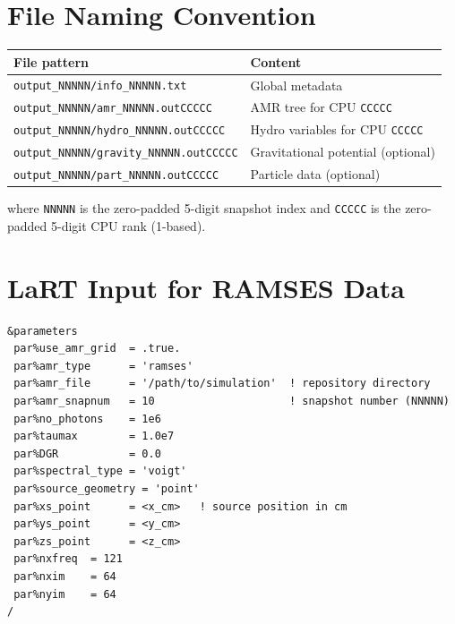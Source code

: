 \documentclass[english,a4paper]{my_memo}
\begin{document}
\section{File Naming Convention}

\begin{center}
\begin{tabular}{ll}
\toprule
File pattern & Content \\
\midrule
\texttt{output\_NNNNN/info\_NNNNN.txt}         & Global metadata \\
\texttt{output\_NNNNN/amr\_NNNNN.outCCCCC}     & AMR tree for CPU \texttt{CCCCC}\\
\texttt{output\_NNNNN/hydro\_NNNNN.outCCCCC}   & Hydro variables for CPU \texttt{CCCCC}\\
\texttt{output\_NNNNN/gravity\_NNNNN.outCCCCC} & Gravitational potential (optional)\\
\texttt{output\_NNNNN/part\_NNNNN.outCCCCC}    & Particle data (optional)\\
\bottomrule
\end{tabular}
\end{center}

where \texttt{NNNNN} is the zero-padded 5-digit snapshot index and
\texttt{CCCCC} is the zero-padded 5-digit CPU rank (1-based).

\section{LaRT Input for RAMSES Data}

\begin{lstlisting}[style=shellstyle]
&parameters
 par%use_amr_grid  = .true.
 par%amr_type      = 'ramses'
 par%amr_file      = '/path/to/simulation'  ! repository directory
 par%amr_snapnum   = 10                     ! snapshot number (NNNNN)
 par%no_photons    = 1e6
 par%taumax        = 1.0e7
 par%DGR           = 0.0
 par%spectral_type = 'voigt'
 par%source_geometry = 'point'
 par%xs_point      = <x_cm>   ! source position in cm
 par%ys_point      = <y_cm>
 par%zs_point      = <z_cm>
 par%nxfreq  = 121
 par%nxim    = 64
 par%nyim    = 64
/
\end{lstlisting}
\end{document}

